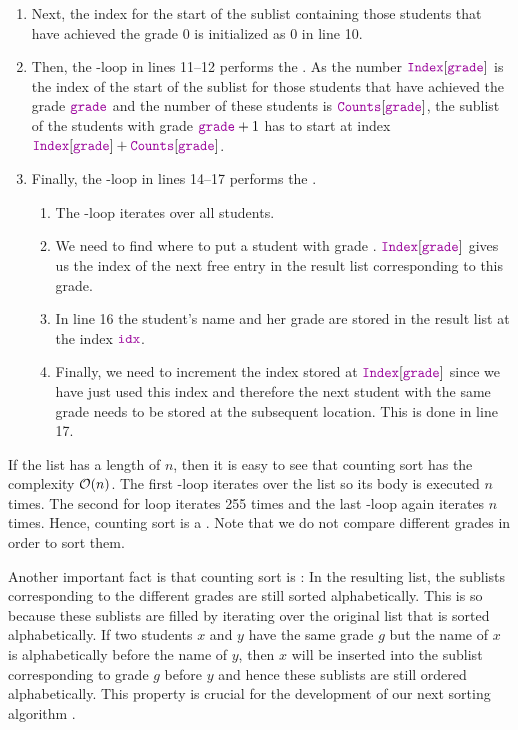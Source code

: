 \begin{enumerate}
\item Next, the index for the start of the sublist containing those students that have achieved the grade $0$
      is initialized as $0$ in line 10. 
\item Then, the -loop in lines 11--12 performs the . As the number
      $\mytt{Index}[\mytt{grade}]$ is the index of the start of the sublist for those students that have
      achieved the grade  $\mytt{grade}$ and the number of these
      students is $\mytt{Counts}[\mytt{grade}]$, the sublist of the students with grade $\mytt{grade}+1$
      has to start at index 
      \\[0.2cm]
      \hspace*{1.3cm}
      $\mytt{Index}[\mytt{grade}] + \mytt{Counts}[\mytt{grade}]$.
\item Finally, the -loop in lines 14--17 performs the .
      \begin{enumerate}
      \item The -loop iterates over all students. 
      \item We need to find where to put a student with grade .
            $\mytt{Index}[\mytt{grade}]$ gives us the index  of the next free entry in the
            result list  corresponding to this grade.
      \item In line 16 the student's name and her grade are stored in the result list 
            at the index $\mytt{idx}$.
      \item Finally, we need to increment the index stored at $\mytt{Index}[\mytt{grade}]$ since we have
            just used this index and therefore the next student with the same grade needs to be
            stored at the subsequent location.  This is done in line 17.
      \end{enumerate}
\end{enumerate}
If the list  has a length of $n$, then it is easy to
see that counting sort has the complexity $\mathcal{O}(n)$.  The first -loop iterates over the list  so
its body is executed $n$ times.  The second for loop iterates 255 times and the last -loop again
iterates $n$ times.  Hence, counting sort is a .  Note that we do not compare different grades in
order to sort them.

Another important fact is that counting sort is : In the resulting list, the sublists
corresponding to the different grades are still sorted alphabetically.  This is so because these sublists are
filled by iterating over the original list that is sorted alphabetically.  If two students $x$ and $y$ have the
same grade $g$ but the name of $x$ is alphabetically before the name of $y$, then $x$ will be inserted into the
sublist corresponding to grade $g$ before $y$ and hence these sublists are still ordered alphabetically.  This property
is crucial for the development of our next sorting algorithm .

